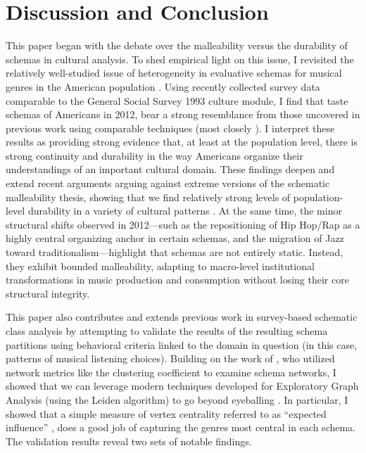 \documentclass[preprint, authoryear,11pt, 3p]{elsarticle}
\begin{document}
\section{Discussion and Conclusion}
This paper began with the debate over the malleability versus the durability of schemas in cultural analysis. To shed empirical light on this issue, I revisited the relatively well-studied issue of heterogeneity in evaluative schemas for musical genres in the American population \citep{goldberg2011mapping}. Using recently collected survey data comparable to the General Social Survey 1993 culture module, I find that taste schemas of Americans in 2012, bear a strong resemblance from those uncovered in previous work using comparable techniques (most closely \citet{boutyline2017improving}). I interpret these results as providing strong evidence that, at least at the population level, there is strong continuity and durability in the way Americans organize their understandings of an important cultural domain. These findings deepen and extend recent arguments arguing against extreme versions of the schematic malleability thesis, showing that we find relatively strong levels of population-level durability in a variety of cultural patterns \citep{vaisey2016cultural}. At the same time, the minor structural shifts observed in 2012—such as the repositioning of Hip Hop/Rap as a highly central organizing anchor in certain schemas, and the migration of Jazz toward traditionalism—highlight that schemas are not entirely static. Instead, they exhibit bounded malleability, adapting to macro-level institutional transformations in music production and consumption without losing their core structural integrity.

This paper also contributes and extends previous work in survey-based schematic class analysis by attempting to validate the results of the resulting schema partitions using behavioral criteria linked to the domain in question (in this case, patterns of musical listening choices). Building on the work of \citet{goldberg2011mapping}, who utilized network metrics like the clustering coefficient to examine schema networks, I showed that we can leverage modern techniques developed for Exploratory Graph Analysis (using the Leiden algorithm) to go beyond eyeballing \citep{epskamp2012qgraph,networktools}. In particular, I showed that a simple measure of vertex centrality referred to as ``expected influence'' \citep{robinaugh2016identifying}, does a good job of capturing the genres most central in each schema. The validation results reveal two sets of notable findings. 
\end{document}
